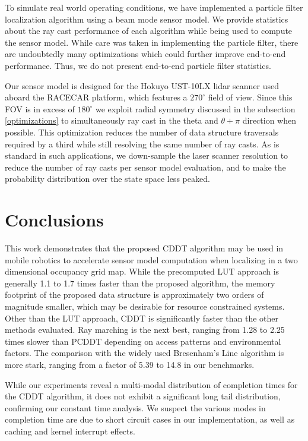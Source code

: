\documentclass[letterpaper, 10 pt, conference]{ieeeconf}  %
\begin{document}
To simulate real world operating conditions, we have implemented a particle filter localization algorithm using a beam mode sensor model. We provide statistics about the ray cast performance of each algorithm while being used to compute the sensor model. While care was taken in implementing the particle filter, there are undoubtedly many optimizations which could further improve end-to-end performance. Thus, we do not present end-to-end particle filter statistics.

Our sensor model is designed for the Hokuyo UST-10LX lidar scanner used aboard the RACECAR platform, which features a $270^{\circ}$ field of view. Since this FOV is in excess of $180^{\circ}$ we exploit radial symmetry discussed in the subsection \ref{optimizations} to simultaneously ray cast in the theta and $\theta+\pi$ direction when possible. This optimization reduces the number of data structure traversals required by a third while still resolving the same number of ray casts. As is standard in such applications, we down-sample the laser scanner resolution to reduce the number of ray casts per sensor model evaluation, and to make the probability distribution over the state space less peaked.

\section{Conclusions}

This work demonstrates that the proposed CDDT algorithm may be used in mobile robotics to accelerate sensor model computation when localizing in a two dimensional occupancy grid map. While the precomputed LUT approach is generally 1.1 to 1.7 times faster than the proposed algorithm, the memory footprint of the proposed data structure is approximately two orders of magnitude smaller, which may be desirable for resource constrained systems. Other than the LUT approach, CDDT is significantly faster than the other methods evaluated. Ray marching is the next best, ranging from 1.28 to 2.25 times slower than PCDDT depending on access patterns and environmental factors. The comparison with the widely used Bresenham's Line algorithm is more stark, ranging from a factor of 5.39 to 14.8 in our benchmarks.

While our experiments reveal a multi-modal distribution of completion times for the CDDT algorithm, it does not exhibit a significant long tail distribution, confirming our constant time analysis. We suspect the various modes in completion time are due to short circuit cases in our implementation, as well as caching and kernel interrupt effects.
\end{document}

